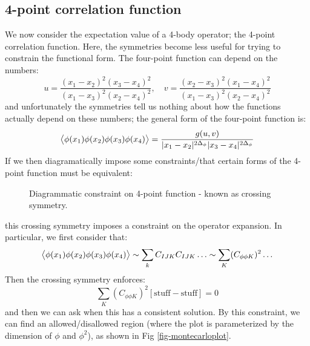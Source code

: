 \subsection{4-point correlation function}
We now consider the expectation value of a 4-body operator; the 4-point correlation function. Here, the symmetries become less useful for trying to constrain the functional form. The four-point function can depend on the numbers:
\begin{equation}
    u = \frac{(x_1 - x_2)^2(x_3 - x_4)^2}{(x_1 - x_3)^2(x_2 - x_4)^2}, \quad v = \frac{(x_2 - x_3)^2(x_1 - x_4)^2}{(x_1 - x_3)^2(x_2 - x_4)^2}
\end{equation}
and unfortunately the symmetries tell us nothing about how the functions actually depend on these numbers; the general form of the four-point function is:
\begin{equation}
    \avg{\phi(x_1)\phi(x_2)\phi(x_3)\phi(x_4)} = \frac{g(u, v)}{\abs{x_1 - x_2}^{2\Delta_\phi}\abs{x_3 - x_4}^{2\Delta_\phi}}
\end{equation}
If we then diagramatically impose some constraints/that certain forms of the 4-point function must be equivalent:
\begin{figure}[htbp]
    \centering
    \caption{Diagrammatic constraint on 4-point function - known as crossing symmetry.}
    \label{fig-crossingsymmetry}
\end{figure}
this crossing symmetry imposes a constraint on the operator expansion. In particular, we first consider that:
\begin{equation}
    \avg{\phi(x_1)\phi(x_2)\phi(x_3)\phi(x_4)} \sim \sum_k C_{IJK}C_{IJK}\ldots \sim \sum_K(C_{\phi\phi K})^2\ldots
\end{equation}
Then the crossing symmetry enforces:
\begin{equation}
    \sum_K(C_{\phi\phi K})^2[\text{stuff} - \text{stuff}] = 0
\end{equation}
and then we can ask when this has a consistent solution. By this constraint, we can find an allowed/disallowed region (where the plot is parameterized by the dimension of $\phi$ and $\phi^2$), as shown in Fig \ref{fig-montecarloplot}.

